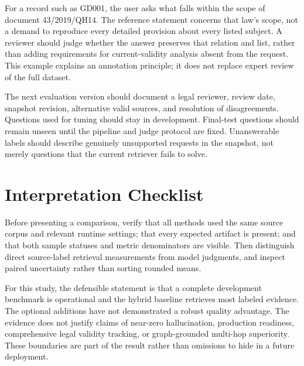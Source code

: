 \documentclass[11pt,a4paper,oneside]{report}
\begin{document}
For a record such as GD001, the user asks what falls within the scope of document 43/2019/QH14. The reference statement concerns that law's scope, not a demand to reproduce every detailed provision about every listed subject. A reviewer should judge whether the answer preserves that relation and list, rather than adding requirements for current-validity analysis absent from the request. This example explains an annotation principle; it does not replace expert review of the full dataset.

The next evaluation version should document a legal reviewer, review date, snapshot revision, alternative valid sources, and resolution of disagreements. Questions used for tuning should stay in development. Final-test questions should remain unseen until the pipeline and judge protocol are fixed. Unanswerable labels should describe genuinely unsupported requests in the snapshot, not merely questions that the current retriever fails to solve.

\section{Interpretation Checklist}
Before presenting a comparison, verify that all methods used the same source corpus and relevant runtime settings; that every expected artifact is present; and that both sample statuses and metric denominators are visible. Then distinguish direct source-label retrieval measurements from model judgments, and inspect paired uncertainty rather than sorting rounded means.

For this study, the defensible statement is that a complete development benchmark is operational and the hybrid baseline retrieves most labeled evidence. The optional additions have not demonstrated a robust quality advantage. The evidence does not justify claims of near-zero hallucination, production readiness, comprehensive legal validity tracking, or graph-grounded multi-hop superiority. These boundaries are part of the result rather than omissions to hide in a future deployment.
\end{document}
